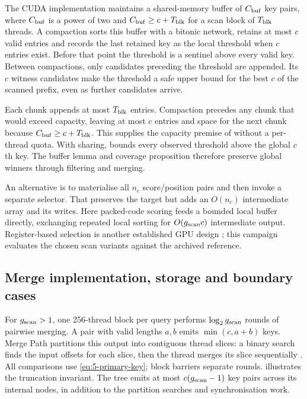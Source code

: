 The CUDA implementation maintains a shared-memory buffer of $C_{\rm buf}$ key
pairs, where $C_{\rm buf}$ is a power of two and $C_{\rm buf}\geq c+T_{\rm blk}$ for a scan block of
$T_{\rm blk}$ threads. A compaction sorts this buffer with a bitonic network,
retains at most $c$ valid entries and records the last retained key as
the local threshold when $c$ entries exist. Before that point the
threshold is a sentinel above every valid key. Between compactions,
only candidates preceding the threshold are appended. Its $c$ witness
candidates make the threshold a safe upper bound for the best $c$ of
the scanned prefix, even as further candidates arrive.

Each chunk appends at most $T_{\rm blk}$ entries. Compaction precedes
any chunk that would exceed capacity, leaving at most $c$ entries and
space for the next chunk because $C_{\rm buf}\geq c+T_{\rm blk}$.
This supplies the capacity premise of  without a
per-thread quota. With sharing,  bounds every
observed threshold above the global $c$th key. The buffer lemma and
coverage proposition therefore preserve global winners through filtering
and merging.

An alternative is to materialise all $n_c$ score/position pairs and then
invoke a separate selector. That preserves the target but adds an
$O(n_c)$ intermediate array and its writes. Here packed-code scoring
feeds a bounded local buffer directly, exchanging repeated local sorting
for $O(g_{\mathrm{scan}} c)$ intermediate output. Register-based selection is another
established GPU design \cite{johnson_gpu}; this campaign evaluates the
chosen scan variants against the archived reference.

\subsection{Merge implementation, storage and boundary cases}

For $g_{\mathrm{scan}}>1$, one 256-thread block per query performs $\log_2 g_{\mathrm{scan}}$ rounds of
pairwise merging. A pair with valid lengths $a,b$ emits
$\min(c,a+b)$ keys. Merge Path partitions this output into contiguous
thread slices: a binary search finds the input offsets for each slice,
then the thread merges its slice sequentially \cite{gpu_merge_path}.
All comparisons use \cref{eq:5-primary-key}; block barriers separate
rounds.  illustrates the truncation invariant.
The tree emits at most $c(g_{\mathrm{scan}}-1)$ key pairs across its internal nodes,
in addition to the partition searches and synchronisation work.

